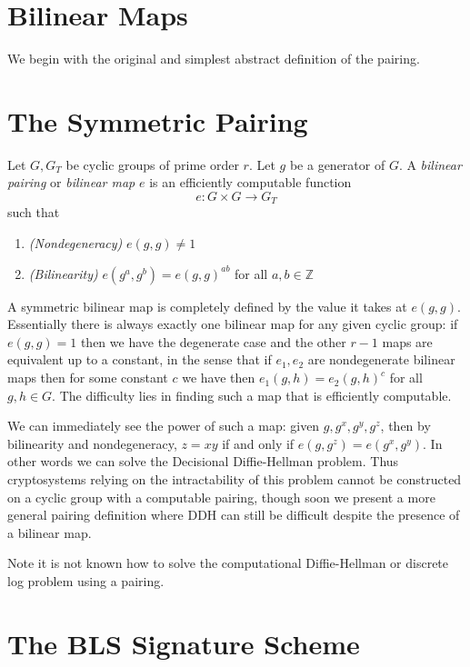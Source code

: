 \section{Bilinear Maps}

We begin with the original and simplest abstract definition of the pairing.

\section{\label{sec:symmetricpairing}The Symmetric Pairing}

Let $G, G_T$ be cyclic groups of prime order $r$.
Let $g$ be a generator of $G$.
A \emph{bilinear pairing} or \emph{bilinear map}
$e$ is an efficiently computable function
\[
e:G \times G \rightarrow G_T
\]
such that
\begin{enumerate}
\item
\emph{(Nondegeneracy)}
$e(g,g) \ne 1$
\item
\emph{(Bilinearity)}
$e(g^a, g^b) = e(g,g)^{a b}$ for all $a, b \in \mathbb{Z}$
\end{enumerate}

A symmetric bilinear map is completely defined by the value it
takes at $e(g,g)$. Essentially there is always exactly one bilinear map
for any given cyclic group: if
$e(g,g)=1$ then we have the degenerate case and the other $r-1$ maps are
equivalent up to a constant,
in the sense that if $e_1, e_2$ are nondegenerate bilinear maps then for
some constant $c$ we have
then $e_1(g,h) = e_2(g,h)^c$ for all $g,h \in G$.
The difficulty lies in finding such a map
that is efficiently computable.

We can immediately see the power of such a map: given
$g, g^x, g^y, g^z$, then by bilinearity and nondegeneracy,
$z = x y$ if and only if
$e(g, g^z) = e(g^x, g^y)$. In other words we can solve the Decisional
Diffie-Hellman problem.
Thus cryptosystems relying on the intractability of this
problem cannot be constructed on a cyclic group with
a computable pairing, though soon we present a more general pairing
definition where DDH can still be difficult despite the presence of
a bilinear map.

Note it is not known how to solve the computational Diffie-Hellman
or discrete log problem using a pairing.

\section{The BLS Signature Scheme}

